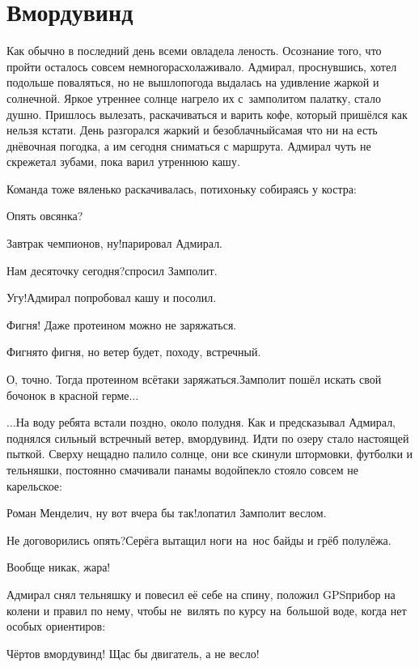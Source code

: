 \chapter{Вмордувинд}
\vepsianrose

Как обычно в последний день всеми овладела леность. Осознание того, что пройти осталось совсем немного\mdash расхолаживало. Адмирал, проснувшись, хотел подольше поваляться, но не вышло\mdash погода выдалась на удивление жаркой и солнечной. Яркое утреннее солнце нагрело их с~замполитом палатку, стало душно. Пришлось вылезать, раскачиваться и варить кофе, который пришёлся как нельзя кстати. День разгорался жаркий и безоблачный\mdash самая что ни на есть днёвочная погодка, а им сегодня сниматься с маршрута. Адмирал чуть не скрежетал зубами, пока варил утреннюю кашу. 

Команда тоже вяленько раскачивалась, потихоньку собираясь у костра:

\diagdash Опять овсянка?

\diagdash Завтрак чемпионов, ну!\mdash парировал Адмирал.

\diagdash Нам десяточку сегодня?\mdash спросил Замполит.

\diagdash Угу!\mdash Адмирал попробовал кашу и посолил.

\diagdash Фигня! Даже протеином можно не заряжаться.

\diagdash Фигня\sdash то фигня, но ветер будет, походу, встречный. 

\diagdash О, точно. Тогда протеином всё\sdash таки заряжаться.\mdash Замполит пошёл искать свой бочонок в красной герме$\ldots$

$\ldots$На воду ребята встали поздно, около полудня. Как и предсказывал Адмирал, поднялся сильный встречный ветер, вмордувинд. Идти по озеру стало настоящей пыткой. Сверху нещадно палило солнце, они все скинули штормовки, футболки и тельняшки, постоянно смачивали панамы водой\mdash пекло стояло совсем не карельское:

\diagdash Роман Менделич, ну вот вчера бы так!\mdash лопатил Замполит веслом.  

\diagdash Не договорились опять?\mdash Серёга вытащил ноги на~нос байды и грёб полулёжа.

\diagdash Вообще никак, жара!

Адмирал снял тельняшку и повесил её себе на спину, положил GPS\sdash прибор на колени и правил по нему, чтобы не~вилять по курсу на~большой воде, когда нет особых ориентиров:

\diagdash Чёртов вмордувинд! Щас бы двигатель, а не весло!

